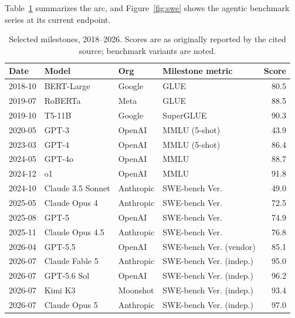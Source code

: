 Table~\ref{tab:timeline} summarizes the arc, and Figure~\ref{fig:swe} shows
the agentic benchmark series at its current endpoint.

\begin{table}[t]
\centering
\caption{Selected milestones, 2018--2026. Scores are as originally reported by
the cited source; benchmark variants are noted.}\label{tab:timeline}
\small
\begin{tabular}{@{}llllr@{}}
\toprule
Date & Model & Org & Milestone metric & Score \\
\midrule
2018-10 & BERT-Large & Google & GLUE & 80.5 \\
2019-07 & RoBERTa & Meta & GLUE & 88.5 \\
2019-10 & T5-11B & Google & SuperGLUE & 90.3 \\
2020-05 & GPT-3 & OpenAI & MMLU (5-shot) & 43.9 \\
2023-03 & GPT-4 & OpenAI & MMLU (5-shot) & 86.4 \\
2024-05 & GPT-4o & OpenAI & MMLU & 88.7 \\
2024-12 & o1 & OpenAI & MMLU & 91.8 \\
2024-10 & Claude 3.5 Sonnet & Anthropic & SWE-bench Ver. & 49.0 \\
2025-05 & Claude Opus 4 & Anthropic & SWE-bench Ver. & 72.5 \\
2025-08 & GPT-5 & OpenAI & SWE-bench Ver. & 74.9 \\
2025-11 & Claude Opus 4.5 & Anthropic & SWE-bench Ver. & 76.8 \\
2026-04 & GPT-5.5 & OpenAI & SWE-bench Ver. (vendor) & 85.1 \\
2026-07 & Claude Fable 5 & Anthropic & SWE-bench Ver. (indep.) & 95.0 \\
2026-07 & GPT-5.6 Sol & OpenAI & SWE-bench Ver. (indep.) & 96.2 \\
2026-07 & Kimi K3 & Moonshot & SWE-bench Ver. (indep.) & 93.4 \\
2026-07 & Claude Opus 5 & Anthropic & SWE-bench Ver. (indep.) & 97.0 \\
\bottomrule
\end{tabular}
\end{table}
